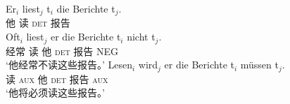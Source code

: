 \eal
\ex 
\gll Er$_i$ liest$_j$ t$_i$ die Berichte t$_j$.\\
	 他 读 {}    \textsc{det} 报告\\
\ex 
\gll Oft$_i$ liest$_j$ er die Berichte t$_i$ nicht t$_j$.\\
	经常 读 他 \textsc{det} 报告 {} NEG\\
\glt `他经常不读这些报告。'
\ex 
\gll Lesen$_i$ wird$_j$ er die Berichte t$_i$ müssen t$_j$.\\
	 读 \textsc{aux} 他 \textsc{det} 报告 {} \textsc{aux}\\
\glt `他将必须读这些报告。'
\zl

